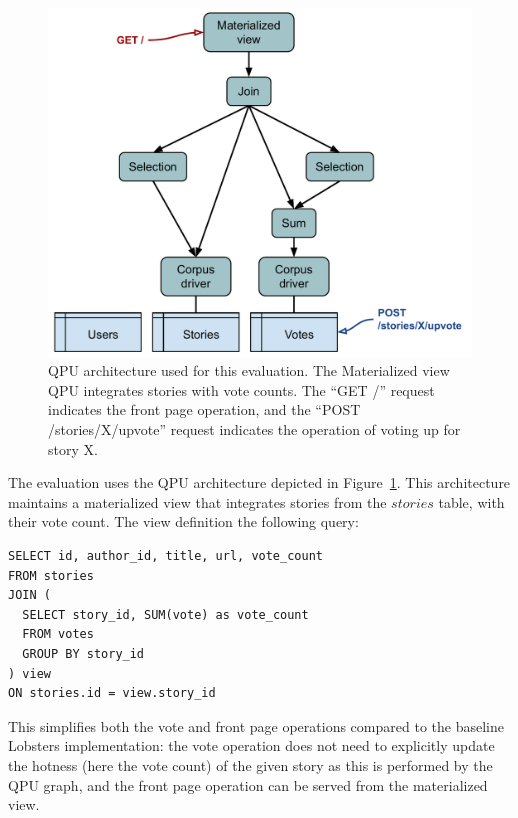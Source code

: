 \begin{figure}[H]
  \centering
    \includegraphics[scale=0.5]{./figures/evaluation/lobsters_architecture_eval.pdf}
  \caption{QPU architecture used for this evaluation. The Materialized view QPU integrates stories with vote counts.
  The ``GET /'' request indicates the front page operation, and the ``POST /stories/X/upvote'' request indicates the operation of voting up for story X.}
  \label{fig:eval_lobsters_qpu_arch}
\end{figure}

\bigskip
\noindent
The evaluation uses the QPU architecture depicted in Figure~\ref{fig:eval_lobsters_qpu_arch}.
This architecture maintains a materialized view that integrates stories from the $stories$ table,
with their vote count.
The view definition the following query:

\begin{lstlisting}[caption={Definition of the materialized view maintained by the QPU graph shown in Figure~\ref{fig:eval_lobsters_qpu_arch}.}]
SELECT id, author_id, title, url, vote_count
FROM stories
JOIN (
  SELECT story_id, SUM(vote) as vote_count
  FROM votes
  GROUP BY story_id
) view
ON stories.id = view.story_id
\end{lstlisting}

This simplifies both the vote and front page operations compared to the baseline Lobsters implementation:
the vote operation does not need to explicitly update the hotness (here the vote count) of the given story as this
is performed by the QPU graph,
and the front page operation can be served from the materialized view.


